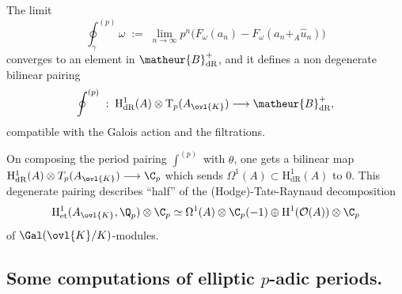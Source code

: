 \begin{thm}
The limit 
\begin{equation*}
 \oint^{(p)}_{\gamma}\omega \;:=\;
 \lim_{n\rightarrow\infty}p^n\bigl(F_{\omega}(a_n)-F_{\omega}
 (a_n+_A\widehat{u}_n)\bigr)
\end{equation*}
converges to an element in $\matheur{B}^+_{\mathrm{dR}}$, and it defines
a non degenerate bilinear pairing
\begin{equation*}
 \oint^{(p)}\;:\;
 \mathrm{H}^{1}_{\mathrm{dR}}(A)\otimes
 \mathrm{T}_p(A_{\ovl{K}})\longrightarrow\matheur{B}_{\mathrm{dR}}^+,
\end{equation*}
compatible with the Galois action and the filtrations.
\end{thm}

\begin{rem}
 On composing the period pairing $\int^{(p)}$ with $\theta$, one gets a
 bilinear map $\mathrm{H}^1_{\mathrm{dR}}(A) \otimes T_p(A_{\ovl{K}})
 \longrightarrow \C_p$ which sends $\Omega^1(A)\subset
 \mathrm{H}^1_{\mathrm{dR}}(A)$ to $0$.  This degenerate pairing
 describes ``half'' of the (Hodge)-Tate-Raynaud decomposition
 \begin{equation*}
  \mathrm{H}^1_{\mathrm{et}}(A_{\ovl{K}},{\Q}_p)\otimes {\C}_p \simeq
   \Omega^1(A)\otimes
   {\C}_p(-1) \oplus \mathrm{H}^1(\mathcal{O}(A))\otimes {\C}_p
 \end{equation*}
 of $\Gal({\ovl{K}}/K)$-modules.
\end{rem}


\subsection{Some computations of elliptic $p$-adic periods.}
\label{sub-computation}

